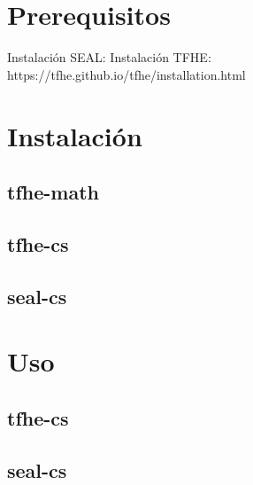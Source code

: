 
\section{Prerequisitos}

Instalación SEAL:
Instalación TFHE: https://tfhe.github.io/tfhe/installation.html

\section{Instalación}

\subsection{tfhe-math}


\subsection{tfhe-cs}


\subsection{seal-cs}


\section{Uso}


\subsection{tfhe-cs}



\subsection{seal-cs}
